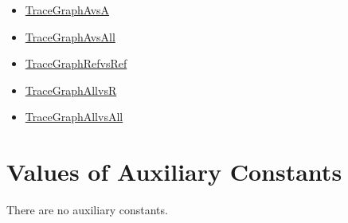 \documentclass[12pt]{article}
\begin{document}
\begin{itemize}
\item{\hyperref{../../../../traceygraphs/trajecto/avsa.svg}{}{}{TraceGraphAvsA}}
\item{\hyperref{../../../../traceygraphs/trajecto/avsall.svg}{}{}{TraceGraphAvsAll}}
\item{\hyperref{../../../../traceygraphs/trajecto/refvsref.svg}{}{}{TraceGraphRefvsRef}}
\item{\hyperref{../../../../traceygraphs/trajecto/allvsr.svg}{}{}{TraceGraphAllvsR}}
\item{\hyperref{../../../../traceygraphs/trajecto/allvsall.svg}{}{}{TraceGraphAllvsAll}}
\end{itemize}
\section{Values of Auxiliary Constants}
\label{Sec:AuxConstants}
There are no auxiliary constants.
\end{document}
